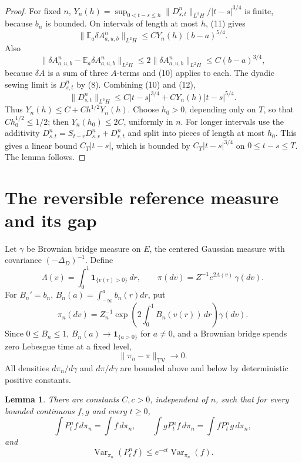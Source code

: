 \documentclass[12pt]{article}
\newtheorem{lemma}{Lemma}
\newcommand{\E}{\mathbb E}
\newcommand{\1}{\mathbf 1}
\newcommand{\Var}{\operatorname{Var}}
\newcommand{\TV}{\operatorname{TV}}
\begin{document}
\begin{proof}
For fixed \(n\), \(Y_n(h)=\sup_{0<t-s\le h}\|D^n_{s,t}\|_{L^2H}/|t-s|^{3/4}\)
is finite, because \(b_n\) is bounded.  On intervals of length at most \(h\),
(11) gives
\[
 \|\E_a\delta A^n_{a,u,b}\|_{L^2H}\le C Y_n(h)(b-a)^{5/4}.
\]
Also
\[
\|\delta A^n_{a,u,b}-\E_a\delta A^n_{a,u,b}\|_{L^2H}
 \le 2\|\delta A^n_{a,u,b}\|_{L^2H}
 \le C(b-a)^{3/4},
\]
because \(\delta A\) is a sum of three \(A\)-terms and (10) applies to each.
The dyadic sewing limit is \(D^n_{s,t}\) by (8).  Combining (10) and (12),
\[
 \|D^n_{s,t}\|_{L^2H}\le C|t-s|^{3/4}
        +C Y_n(h)|t-s|^{5/4}.
\]
Thus \(Y_n(h)\le C+Ch^{1/2}Y_n(h)\).  Choose \(h_0>0\), depending only on
\(T\), so that \(Ch_0^{1/2}\le1/2\); then \(Y_n(h_0)\le2C\), uniformly in
\(n\).  For longer intervals use the additivity
\(D^n_{s,t}=S_{t-r}D^n_{s,r}+D^n_{r,t}\) and split into pieces of length at
most \(h_0\).  This gives a linear bound \(C_T|t-s|\), which is bounded by
\(C_T|t-s|^{3/4}\) on \(0\le t-s\le T\).  The lemma follows.
\end{proof}

\section*{The reversible reference measure and its gap}

Let \(\gamma\) be Brownian bridge measure on \(E\), the centered Gaussian
measure with covariance \((-\Delta_D)^{-1}\).  Define
\[
  \Lambda(v)=\int_0^1\1_{\{v(r)>0\}}\,dr,\qquad
  \pi(dv)=Z^{-1}e^{2\Lambda(v)}\,\gamma(dv).                 \tag{13}
\]
For \(B_n'=b_n\), \(B_n(a)=\int_{-\infty}^ab_n(r)dr\), put
\[
   \pi_n(dv)=Z_n^{-1}\exp\left(2\int_0^1B_n(v(r))\,dr\right)\gamma(dv).
\]
Since \(0\le B_n\le1\), \(B_n(a)\to\1_{\{a>0\}}\) for \(a\ne0\), and a
Brownian bridge spends zero Lebesgue time at a fixed level,
\[
        \|\pi_n-\pi\|_{\TV}\to0 .                            \tag{14}
\]
All densities \(d\pi_n/d\gamma\) and \(d\pi/d\gamma\) are bounded above and
below by deterministic positive constants.

\begin{lemma}\label{lem:reggap}
There are constants \(C,c>0\), independent of \(n\), such that for every
bounded continuous \(f,g\) and every \(t\ge0\),
\[
 \int P_t^n f\,d\pi_n=\int f\,d\pi_n,\qquad
 \int gP_t^n f\,d\pi_n=\int fP_t^n g\,d\pi_n,                \tag{15}
\]
and
\[
        \Var_{\pi_n}(P_t^n f)\le e^{-ct}\Var_{\pi_n}(f).      \tag{16}
\]
\end{lemma}
\end{document}
